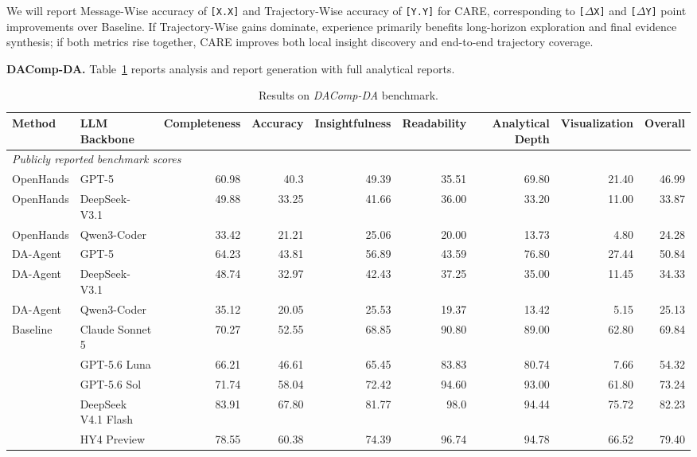 \documentclass{article}
\newcommand{\method}{\textsc{CARE}}
\newcommand{\tabpubliclyreported}[1]{%
  \multicolumn{#1}{l}{\textit{Publicly reported benchmark scores}}\\%
}
\begin{document}
We will report Message-Wise accuracy of \texttt{[X.X]} and Trajectory-Wise accuracy of \texttt{[Y.Y]} for \method{}, corresponding to \texttt{[$\Delta$X]} and \texttt{[$\Delta$Y]} point improvements over Baseline.
If Trajectory-Wise gains dominate, experience primarily benefits long-horizon exploration and final evidence synthesis; if both metrics rise together, \method{} improves both local insight discovery and end-to-end trajectory coverage.

\noindent\textbf{DAComp-DA.} Table~\ref{tab:dacomp-matrix} reports analysis and report generation with full analytical reports.

\begin{table}[t]
  \caption{Results on \textit{DAComp-DA} benchmark.}
  \label{tab:dacomp-matrix}
  \centering
  \scriptsize
  \setlength{\tabcolsep}{2.5pt}
  \begin{tabular}{llrrrrrrr}
    \toprule
    Method & LLM Backbone & Completeness & Accuracy & Insightfulness & Readability & Analytical Depth & Visualization & Overall \\
    \midrule
    \tabpubliclyreported{9}
    OpenHands & GPT-5 & 60.98 & 40.3 & 49.39 & 35.51 & 69.80 & 21.40 & 46.99 \\
    OpenHands & DeepSeek-V3.1 & 49.88 & 33.25 & 41.66 & 36.00 & 33.20 & 11.00 & 33.87 \\
    OpenHands & Qwen3-Coder & 33.42 & 21.21 & 25.06 & 20.00 & 13.73 & 4.80 & 24.28 \\
    DA-Agent & GPT-5 & 64.23 & 43.81 & 56.89 & 43.59 & 76.80 & 27.44 & 50.84 \\
    DA-Agent & DeepSeek-V3.1 & 48.74 & 32.97 & 42.43 & 37.25 & 35.00 & 11.45 & 34.33 \\
    DA-Agent & Qwen3-Coder & 35.12 & 20.05 & 25.53 & 19.37 & 13.42 & 5.15 & 25.13 \\
    \midrule
    \multirow{6}{*}{Baseline}
      & Claude Sonnet 5 & 70.27 & 52.55 & 68.85 & 90.80 & 89.00 & 62.80 & 69.84 \\
      & GPT-5.6 Luna & 66.21 & 46.61 & 65.45 & 83.83 & 80.74 & 7.66 & 54.32 \\
      & GPT-5.6 Sol & 71.74 & 58.04 & 72.42 & 94.60 & 93.00 & 61.80 & 73.24 \\
      & DeepSeek V4.1 Flash & 83.91 & 67.80 & 81.77 & 98.0 & 94.44 & 75.72 & 82.23 \\
      & HY4 Preview & 78.55 & 60.38 & 74.39 & 96.74 & 94.78 & 66.52 & 79.40 \\

\end{tabular}
\end{table}
\end{document}
